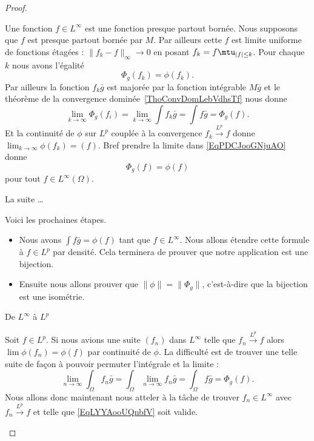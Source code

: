 \begin{proof}
\begin{subproof}
            Une fonction \( f\in L^{\infty}\) est une fonction presque partout bornée. Nous supposons que \( f\) est presque partout bornée par \( M\). Par ailleurs cette \( f\) est limite uniforme de fonctions étagées : \( \| f_k-f \|_{\infty}\to 0\) en posant \( f_k=f\mtu_{| f |\leq k}\). Pour chaque \( k \) nous avons l'égalité
            \begin{equation}    \label{EqPDCJooGNjuAO}
                \Phi_g(f_k)=\phi(f_k).
            \end{equation}
            Par ailleurs la fonction \( f_k\bar g\) est majorée par la fonction intégrable \( M\bar g\) et le théorème de la convergence dominée~\ref{ThoConvDomLebVdhsTf} nous donne
            \begin{equation}
                \lim_{k\to \infty} \Phi_g(f_i)=\lim_{k\to \infty} \int f_k\bar g=\int f\bar g=\Phi_g(f).
            \end{equation}
            Et la continuité de \( \phi\) sur \( L^p\) couplée à la convergence \( f_k\stackrel{L^p}{\longrightarrow}f\) donne \( \lim_{k\to \infty} \phi(f_k)=(f)\). Bref prendre la limite dans \eqref{EqPDCJooGNjuAO} donne
            \begin{equation}
                \Phi_g(f)=\phi(f)
            \end{equation}
            pour tout \( f\in L^{\infty}(\Omega)\).

        \item[La suite \ldots]

            Voici les prochaines étapes.
            \begin{itemize}
                \item Nous avons \( \int f\bar g=\phi(f)\) tant que \( f\in L^{\infty}\). Nous allons étendre cette formule à \( f\in L^p\) par densité. Cela terminera de prouver que notre application est une bijection.
                \item Ensuite nous allons prouver que \( \| \phi \|=\| \Phi_g \|\), c'est-à-dire que la bijection est une isométrie.
            \end{itemize}

        \item[De \( L^{\infty}\) à \( L^p\)]

            Soit \( f\in L^p\). Si nous avions une suite \( (f_n) \) dans \( L^{\infty}\) telle que \( f_n\stackrel{L^p}{\longrightarrow}f\) alors \( \lim \phi(f_n)=\phi(f)\) par continuité de \( \phi\). La difficulté est de trouver une telle suite de façon à pouvoir permuter l'intégrale et la limite :
            \begin{equation}    \label{EqLYYAooUQnbfV}
                \lim_{n\to \infty} \int_{\Omega}f_n\bar g=\int_{\Omega}\lim_{n\to \infty} f_n\bar g=\int_{\Omega}f\bar g=\Phi_g(f).
            \end{equation}
            Nous allons donc maintenant nous atteler à la tâche de trouver \( f_n\in L^{\infty}\) avec \( f_n\stackrel{L^p}{\longrightarrow}f\) et telle que \eqref{EqLYYAooUQnbfV} soit valide.


\end{subproof}
\end{proof}
